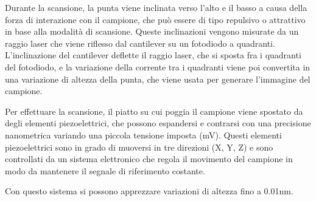 \documentclass[../main.tex]{subfiles}
\begin{document}
Durante la scansione, la punta viene inclinata verso l'alto e il basso a causa della forza di interazione con il campione, che può essere di tipo repulsivo o attrattivo in base alla modalità di scansione. Queste inclinazioni vengono misurate da un raggio laser che viene riflesso dal cantilever su un fotodiodo a quadranti. L'inclinazione del cantilever deflette il raggio laser, che si sposta fra i quadranti del fotodiodo, e la variazione della corrente tra i quadranti viene poi convertita in una variazione di altezza della punta, che viene usata per generare l'immagine del campione.

Per effettuare la scansione, il piatto su cui poggia il campione viene spostato da degli elementi piezoelettrici, che possono espandersi e contrarsi con una precisione nanometrica variando una piccola tensione imposta (mV). Questi elementi piezoelettrici sono in grado di muoversi in tre direzioni (X, Y, Z) e sono controllati da un sistema elettronico che regola il movimento del campione in modo da mantenere il segnale di riferimento costante.

Con questo sistema si possono apprezzare variazioni di altezza fino a 0.01nm.\cite{sun_2018}
\end{document}
